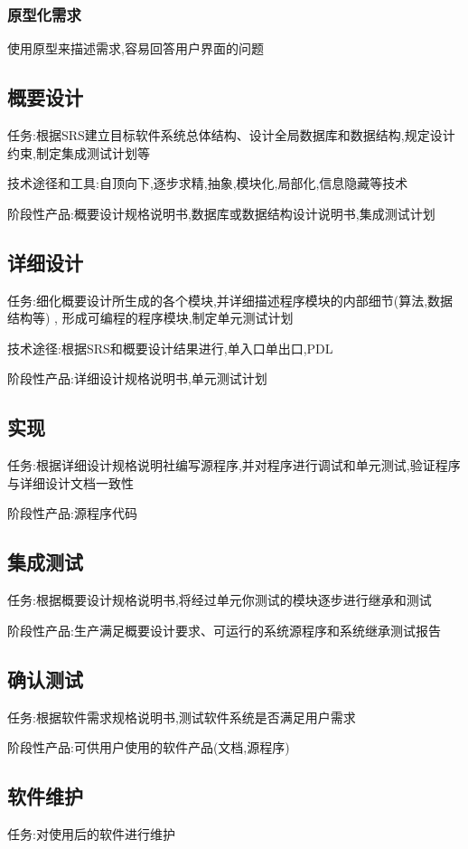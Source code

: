 \documentclass[UTF8,a4paper]{ctexart}
\begin{document}
\subsubsection{原型化需求}
使用原型来描述需求,容易回答用户界面的问题

\subsection{概要设计}
任务:根据SRS建立目标软件系统总体结构、设计全局数据库和数据结构,规定设计约束,制定集成测试计划等

技术途径和工具:自顶向下,逐步求精,抽象,模块化,局部化,信息隐藏等技术

阶段性产品:概要设计规格说明书,数据库或数据结构设计说明书,集成测试计划

\subsection{详细设计}
任务:细化概要设计所生成的各个模块,并详细描述程序模块的内部细节(算法,数据结构等) , 形成可编程的程序模块,制定单元测试计划

技术途径:根据SRS和概要设计结果进行,单入口单出口,PDL

阶段性产品:详细设计规格说明书,单元测试计划

\subsection{实现}
任务:根据详细设计规格说明社编写源程序,并对程序进行调试和单元测试,验证程序与详细设计文档一致性

阶段性产品:源程序代码

\subsection{集成测试}
任务:根据概要设计规格说明书,将经过单元你测试的模块逐步进行继承和测试

阶段性产品:生产满足概要设计要求、可运行的系统源程序和系统继承测试报告

\subsection{确认测试}
任务:根据软件需求规格说明书,测试软件系统是否满足用户需求

阶段性产品:可供用户使用的软件产品(文档,源程序)

\subsection{软件维护}
任务:对使用后的软件进行维护
\end{document}
